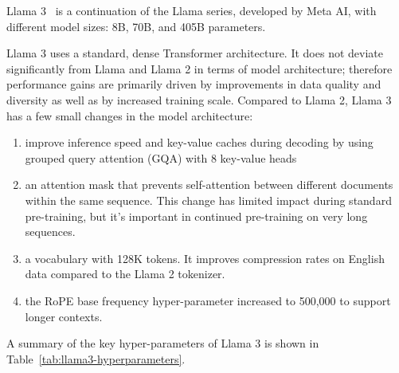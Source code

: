 Llama 3~\cite{llama3} is a continuation of the Llama series, developed by Meta AI, with different model sizes: 8B, 70B, and 405B parameters.

Llama 3 uses a standard, dense Transformer architecture.
It does not deviate significantly from Llama and Llama 2 in terms of model architecture; therefore performance gains are primarily driven by improvements in data quality and diversity as well as by increased training scale.
Compared to Llama 2, Llama 3 has a few small changes in the model architecture:
\begin{enumerate}
	\item improve inference speed and key-value caches during decoding by using grouped query attention (GQA) with 8 key-value heads
	\item an attention mask that prevents self-attention between different documents within the same sequence.
	      This change has limited impact during standard pre-training, but it's important in continued pre-training on very long sequences.
	\item a vocabulary with 128K tokens. It improves compression rates on English data compared to the Llama 2 tokenizer.
	\item the RoPE base frequency hyper-parameter increased to 500,000 to support longer contexts.
\end{enumerate}
A summary of the key hyper-parameters of Llama 3 is shown in Table~\ref{tab:llama3-hyperparameters}.

